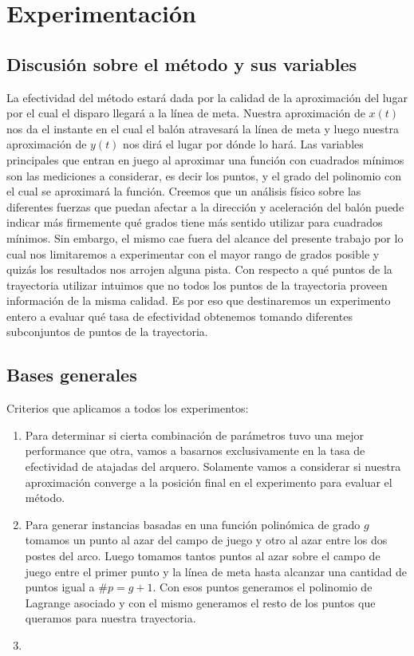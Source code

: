 \section{Experimentación}

\subsection{Discusión sobre el método y sus variables}
La efectividad del método estará dada por la calidad de la aproximación del lugar por el cual el disparo llegará a la línea de meta. 
Nuestra aproximación de $x(t)$ nos da el instante en el cual el balón atravesará la línea de meta y luego nuestra aproximación
de $y(t)$ nos dirá el lugar por dónde lo hará. Las variables principales que entran en juego al aproximar una función con 
cuadrados mínimos son las mediciones a considerar, es decir los puntos, y el grado del polinomio con el cual se aproximará la función.
Creemos que un análisis físico sobre las diferentes fuerzas que puedan afectar a la dirección y aceleración del balón puede indicar 
más firmemente qué grados tiene más sentido utilizar para cuadrados mínimos. Sin embargo, el mismo cae fuera del alcance del presente 
trabajo por lo cual nos limitaremos a experimentar con el mayor rango de grados posible y quizás los resultados nos arrojen alguna pista.
Con respecto a qué puntos de la trayectoria utilizar intuimos que no todos los puntos de la trayectoria proveen información de la misma 
calidad. Es por eso que destinaremos un experimento entero a evaluar qué tasa de efectividad obtenemos tomando diferentes subconjuntos 
de puntos de la trayectoria.

\subsection{Bases generales}
Criterios que aplicamos a todos los experimentos:
\begin{enumerate}
	\item Para determinar si cierta combinación de parámetros tuvo una mejor performance que otra, vamos a basarnos exclusivamente en la tasa 
	de efectividad de atajadas del arquero. Solamente vamos a considerar si nuestra aproximación converge a la posición final en el experimento para 
	evaluar el método.
	\item Para generar instancias basadas en una función polinómica de grado $g$ tomamos un punto al azar del campo de juego y otro al azar entre los dos postes 
del arco. Luego tomamos tantos puntos al azar sobre el campo de juego entre el primer punto y la línea de meta hasta alcanzar una cantidad
de puntos igual a $\#p = g + 1$. Con esos puntos generamos el polinomio de Lagrange asociado y con el mismo generamos el resto de los puntos
que queramos para nuestra trayectoria.
	\item 
\end{enumerate}

